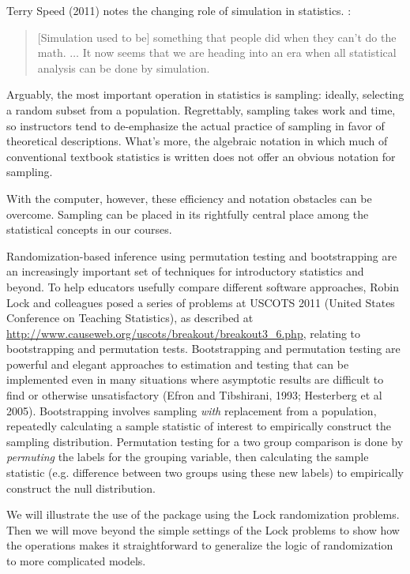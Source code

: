 \documentclass[11pt]{article}\usepackage[]{graphicx}\usepackage[]{color}
\begin{document}
Terry Speed (2011) notes the changing role of simulation in statistics.  :
\begin{quote}
[Simulation used to be] something that people did when they can't do the math. $\ldots$ It now seems
that we are heading into an era when all statistical analysis can be done by
simulation.
\end{quote}

Arguably, the most important operation in statistics is sampling:
ideally, selecting a random subset from a population.  Regrettably,
sampling takes work and time, so instructors tend to de-emphasize the
actual practice of sampling in favor of theoretical descriptions.
What's more, the algebraic notation in which much of conventional
textbook statistics is written does not offer an obvious notation for sampling.

With the computer, however, these efficiency and notation obstacles
can be overcome.  Sampling can be placed in its rightfully central
place among the statistical concepts in our courses.

Randomization-based inference using permutation testing and bootstrapping are an
increasingly important set of techniques for introductory statistics and beyond.
To help educators usefully compare different software approaches, 
Robin Lock and colleagues posed a series of problems at USCOTS 2011 
(United States Conference on Teaching Statistics), 
as described at \url{http://www.causeweb.org/uscots/breakout/breakout3_6.php}, 
relating to bootstrapping and permutation tests. 
Bootstrapping and permutation testing are powerful and elegant approaches to
estimation and testing that can be implemented even in many
situations where asymptotic results are difficult to find or otherwise
unsatisfactory (Efron and Tibshirani, 1993; Hesterberg et al 2005).
Bootstrapping involves sampling \emph{with} replacement from a population,
repeatedly calculating a sample statistic of interest to empirically construct
the sampling distribution. Permutation testing for a two group comparison is
done by \emph{permuting} the labels for the grouping variable, then calculating
the sample statistic (e.g. difference between two groups using these new
labels) to empirically construct the null distribution. 

We will illustrate the use of the  package using the Lock randomization 
problems.  Then we will move beyond the simple settings of the Lock problems to 
show how the  operations makes it straightforward to generalize the 
logic of randomization to more complicated models.
\end{document}
